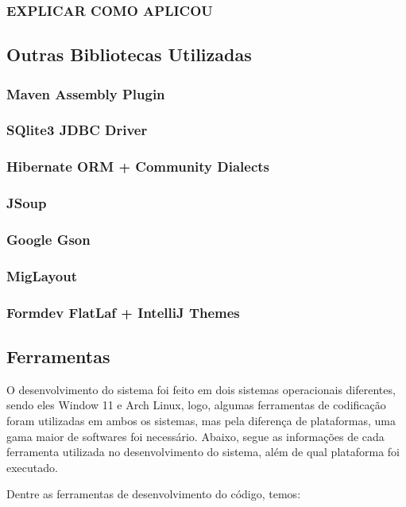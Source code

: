 \documentclass[a4paper,12pt]{article}
\begin{document}
\subsubsection{EXPLICAR COMO APLICOU}

\subsection{Outras Bibliotecas Utilizadas}
\subsubsection{Maven Assembly Plugin}
\subsubsection{SQlite3 JDBC Driver}
\subsubsection{Hibernate ORM + Community Dialects}
\subsubsection{JSoup}
\subsubsection{Google Gson}
\subsubsection{MigLayout}
\subsubsection{Formdev FlatLaf + IntelliJ Themes}

\subsection{Ferramentas}
O desenvolvimento do sistema foi feito em dois sistemas operacionais diferentes, sendo eles Window 11 e Arch Linux, logo, algumas ferramentas 
de codificação foram utilizadas em ambos os sistemas, mas pela diferença de plataformas, uma gama maior de softwares foi necessário. Abaixo, segue 
as informações de cada ferramenta utilizada no desenvolvimento do sistema, além de qual plataforma foi executado.

Dentre as ferramentas de desenvolvimento do código, temos:
\end{document}
